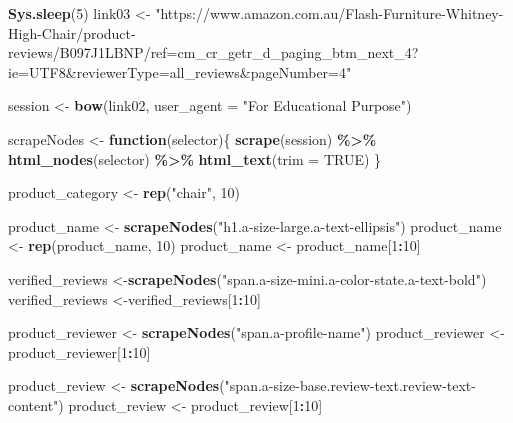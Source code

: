 \documentclass[
]{article}
\newenvironment{Shaded}{\begin{snugshade}}{\end{snugshade}}
\newcommand{\AttributeTok}[1]{\textcolor[rgb]{0.13,0.29,0.53}{#1}}
\newcommand{\ConstantTok}[1]{\textcolor[rgb]{0.56,0.35,0.01}{#1}}
\newcommand{\ControlFlowTok}[1]{\textcolor[rgb]{0.13,0.29,0.53}{\textbf{#1}}}
\newcommand{\DecValTok}[1]{\textcolor[rgb]{0.00,0.00,0.81}{#1}}
\newcommand{\FunctionTok}[1]{\textcolor[rgb]{0.13,0.29,0.53}{\textbf{#1}}}
\newcommand{\NormalTok}[1]{#1}
\newcommand{\OtherTok}[1]{\textcolor[rgb]{0.56,0.35,0.01}{#1}}
\newcommand{\SpecialCharTok}[1]{\textcolor[rgb]{0.81,0.36,0.00}{\textbf{#1}}}
\newcommand{\StringTok}[1]{\textcolor[rgb]{0.31,0.60,0.02}{#1}}
\begin{document}
\begin{Shaded}
\begin{Highlighting}[]
   \FunctionTok{Sys.sleep}\NormalTok{(}\DecValTok{5}\NormalTok{)}
\NormalTok{link03 }\OtherTok{\textless{}{-}} \StringTok{"https://www.amazon.com.au/Flash{-}Furniture{-}Whitney{-}High{-}Chair/product{-}reviews/B097J1LBNP/ref=cm\_cr\_getr\_d\_paging\_btm\_next\_4?ie=UTF8\&reviewerType=all\_reviews\&pageNumber=4"}


\NormalTok{  session }\OtherTok{\textless{}{-}} \FunctionTok{bow}\NormalTok{(link02,}
               \AttributeTok{user\_agent =} \StringTok{"For Educational Purpose"}\NormalTok{)}

\NormalTok{  scrapeNodes }\OtherTok{\textless{}{-}} \ControlFlowTok{function}\NormalTok{(selector)\{}
    \FunctionTok{scrape}\NormalTok{(session) }\SpecialCharTok{\%\textgreater{}\%}
      \FunctionTok{html\_nodes}\NormalTok{(selector) }\SpecialCharTok{\%\textgreater{}\%}
      \FunctionTok{html\_text}\NormalTok{(}\AttributeTok{trim =} \ConstantTok{TRUE}\NormalTok{)}
\NormalTok{  \}}

\NormalTok{  product\_category }\OtherTok{\textless{}{-}} \FunctionTok{rep}\NormalTok{(}\StringTok{"chair"}\NormalTok{, }\DecValTok{10}\NormalTok{)}

\NormalTok{  product\_name }\OtherTok{\textless{}{-}} \FunctionTok{scrapeNodes}\NormalTok{(}\StringTok{"h1.a{-}size{-}large.a{-}text{-}ellipsis"}\NormalTok{)}
\NormalTok{  product\_name }\OtherTok{\textless{}{-}} \FunctionTok{rep}\NormalTok{(product\_name, }\DecValTok{10}\NormalTok{)}
\NormalTok{  product\_name }\OtherTok{\textless{}{-}}\NormalTok{ product\_name[}\DecValTok{1}\SpecialCharTok{:}\DecValTok{10}\NormalTok{]}
  
\NormalTok{  verified\_reviews }\OtherTok{\textless{}{-}}\FunctionTok{scrapeNodes}\NormalTok{(}\StringTok{"span.a{-}size{-}mini.a{-}color{-}state.a{-}text{-}bold"}\NormalTok{)}
\NormalTok{  verified\_reviews }\OtherTok{\textless{}{-}}\NormalTok{verified\_reviews[}\DecValTok{1}\SpecialCharTok{:}\DecValTok{10}\NormalTok{]}
  
\NormalTok{  product\_reviewer }\OtherTok{\textless{}{-}} \FunctionTok{scrapeNodes}\NormalTok{(}\StringTok{"span.a{-}profile{-}name"}\NormalTok{)}
\NormalTok{  product\_reviewer }\OtherTok{\textless{}{-}}\NormalTok{ product\_reviewer[}\DecValTok{1}\SpecialCharTok{:}\DecValTok{10}\NormalTok{]}
  
\NormalTok{  product\_review }\OtherTok{\textless{}{-}} \FunctionTok{scrapeNodes}\NormalTok{(}\StringTok{"span.a{-}size{-}base.review{-}text.review{-}text{-}content"}\NormalTok{)}
\NormalTok{  product\_review }\OtherTok{\textless{}{-}}\NormalTok{ product\_review[}\DecValTok{1}\SpecialCharTok{:}\DecValTok{10}\NormalTok{]}
  

\end{Highlighting}
\end{Shaded}
\end{document}
